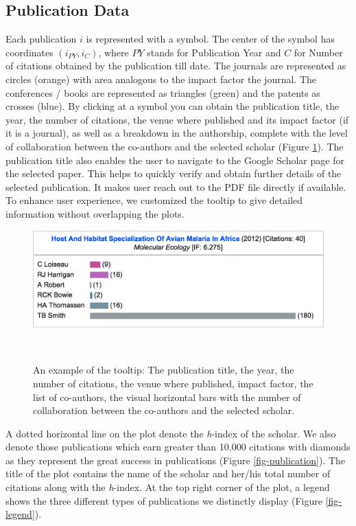 \subsection{Publication Data}
Each publication $i$ is represented with a symbol. The center of the symbol has coordinates $(i_{PY}, i_{C})$, where $PY$ stands for Publication Year and $C$ for Number of citations obtained by the publication till date. The journals are represented as circles (orange) with area analogous to the impact factor the journal. The conferences / books are represented as triangles (green) and the patents as crosses (blue). By clicking at a symbol you can obtain the publication title, the year, the number of citations, the venue where published and its impact factor (if it is a journal), as well as a breakdown in the authorship, complete with the level of collaboration between the co-authors and the selected scholar (Figure \ref{fig-tooltip}). The publication title also enables the user to navigate to the Google Scholar page for the selected paper. This helps to quickly verify and obtain further details of the selected publication. It makes user reach out to the PDF file directly if available. To enhance user experience, we customized the tooltip to give detailed information without overlapping the plots.

\begin{figure}[H]
\centering
  \includegraphics[width=1\textwidth]{figures/fig_tooltip}
  \caption{An example of the tooltip: The publication title, the year, the number of citations, the venue where published, impact factor, the list of co-authors, the visual horizontal bars with the number of collaboration between the co-authors and the selected scholar.}~\label{fig-tooltip}
\end{figure}

A dotted horizontal line on the plot denote the {\it h}-index of the scholar. We also denote those publications which earn greater than 10,000 citations with diamonds as they represent the great success in publications (Figure \ref{fig-publication}). The title of the plot contains the name of the scholar and her/his total number of citations along with the {\it h}-index. At the top right corner of the plot, a legend shows the three different types of publications we distinctly display (Figure \ref{fig-legend}).

